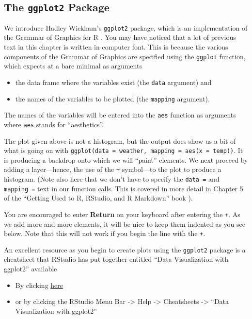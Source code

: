 \documentclass[]{tufte-book}
\providecommand{\tightlist}{%
  \setlength{\itemsep}{0pt}\setlength{\parskip}{0pt}}
\begin{document}
\subsection{\texorpdfstring{The \texttt{ggplot2}
Package}{The ggplot2 Package}}\label{the-ggplot2-package}

We introduce Hadley Wickham's \texttt{ggplot2} package, which is an
implementation of the Grammar of Graphics for R \citep{R-ggplot2}. You
may have noticed that a lot of previous text in this chapter is written
in computer font. This is because the various components of the Grammar
of Graphics are specified using the \texttt{ggplot} function, which
expects at a bare minimal as arguments

\begin{itemize}
\tightlist
\item
  the data frame where the variables exist (the \texttt{data} argument)
  and
\item
  the names of the variables to be plotted (the \texttt{mapping}
  argument).
\end{itemize}

The names of the variables will be entered into the \texttt{aes}
function as arguments where \texttt{aes} stands for ``aesthetics''.

The plot given above is not a histogram, but the output does show us a
bit of what is going on with
\texttt{ggplot(data\ =\ weather,\ mapping\ =\ aes(x\ =\ temp))}. It is
producing a backdrop onto which we will ``paint'' elements. We next
proceed by adding a layer---hence, the use of the \texttt{+} symbol---to
the plot to produce a histogram. (Note also here that we don't have to
specify the \texttt{data\ =} and \texttt{mapping\ =} text in our
function calls. This is covered in more detail in Chapter 5 of the
``Getting Used to R, RStudio, and R Markdown'' book
\citep{usedtor2016}).

You are encouraged to enter \textbf{Return} on your keyboard after
entering the \texttt{+}. As we add more and more elements, it will be
nice to keep them indented as you see below. Note that this will not
work if you begin the line with the \texttt{+}.

An excellent resource as you begin to create plots using the
\texttt{ggplot2} package is a cheatsheet that RStudio has put together
entitled ``Data Visualization with ggplot2'' available

\begin{itemize}
\tightlist
\item
  By clicking
  \href{https://www.rstudio.com/wp-content/uploads/2015/12/ggplot2-cheatsheet-2.0.pdf}{here}
\item
  or by clicking the RStudio Menu Bar -\textgreater{} Help
  -\textgreater{} Cheatsheets -\textgreater{} ``Data Visualization with
  ggplot2''
\end{itemize}
\end{document}
